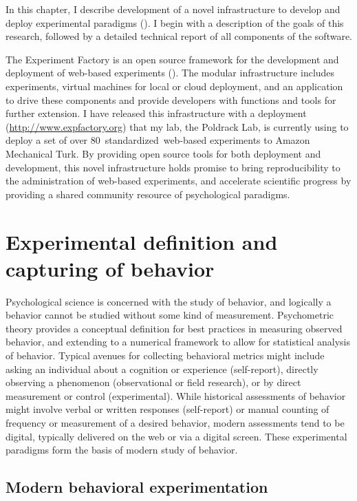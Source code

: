 \documentclass{report}
\begin{document}
In this chapter, I describe development of a novel infrastructure to
develop and deploy experimental paradigms (\cite{Sochat2016-pu}). I begin with a description of the goals of this research, followed
by a detailed technical report of all components of the software.

The Experiment Factory is an open source
framework for the development and deployment of web-based experiments (\cite{Sochat2016-pu}).
The modular infrastructure includes experiments, virtual machines for
local or cloud deployment, and an application to drive these components
and provide developers with functions and tools for further extension. I
have released this infrastructure with a deployment
(\href{http://www.expfactory.org}{http://www.expfactory.org})
that my lab, the Poldrack Lab, is currently using to deploy a set of
over 80~standardized~web-based experiments to Amazon Mechanical Turk. By providing open source tools for both deployment and development, this
novel infrastructure holds promise to bring reproducibility to the
administration of web-based experiments, and accelerate scientific
progress by providing a shared community resource of psychological
paradigms.

\section{Experimental definition and capturing of behavior}

Psychological science is concerned with the study of behavior, and
logically a behavior cannot be studied without some kind of measurement.
Psychometric theory \cite{noauthor_undated-oa} provides
a conceptual definition for best practices in measuring observed
behavior, and extending to a numerical framework to allow for
statistical analysis of behavior. Typical avenues for collecting
behavioral metrics might include asking an individual about a cognition
or experience (self-report), directly observing a phenomenon
(observational or field research), or by direct measurement or control
(experimental). While historical assessments of behavior might involve
verbal or written responses (self-report) or manual counting of
frequency or measurement of a desired behavior, modern assessments tend
to be digital, typically delivered on the web or via a digital screen.
These experimental paradigms form the basis of modern study of behavior.

\subsection{Modern behavioral experimentation}
\end{document}
